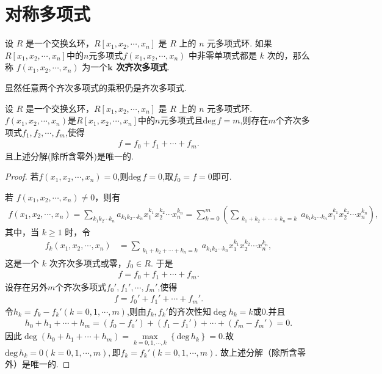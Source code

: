 \documentclass[../../main.tex]{subfiles}%
\begin{document}
\section{对称多项式}

\begin{definition}
设 \( R \) 是一个交换幺环，\( R[x_1, x_2, \cdots, x_n] \) 是 \( R \) 上的 \( n \) 元多项式环. 如果\( R[x_1, x_2, \cdots, x_n] \)中的$n$元多项式\( f(x_1, x_2, \cdots, x_n) \) 中非零单项式都是 \( k \) 次的，那么称 \( f(x_1, x_2, \cdots, x_n) \) 为一个\textbf{\( \boldsymbol{k} \) 次齐次多项式}.
\end{definition}
\begin{remark}
显然任意两个齐次多项式的乘积仍是齐次多项式.
\end{remark}

\begin{theorem}[齐次多项式分解]\label{theorem:多项式的齐次分解}
设 \( R \) 是一个交换幺环，\( R[x_1, x_2, \cdots, x_n] \) 是 \( R \) 上的 \( n \) 元多项式环. \( f(x_1, x_2, \cdots, x_n) \)是\( R[x_1, x_2, \cdots, x_n] \)中的$n$元多项式且$\text{deg}\,f=m$,则存在$m$个齐次多项式$f_1,f_2,\cdots,f_m$,使得
\begin{align*}
f=f_0+f_1+\cdots+f_m.
\end{align*}
且上述分解(除所含零外)是唯一的.
\end{theorem}
\begin{proof}
若$f(x_1,x_2,\cdots,x_n)=0$,则$\text{deg}\,f=0$,取$f_0=f=0$即可.

若 \( f(x_1, x_2, \cdots, x_n) \neq 0 \)，则有
\begin{align*}
f(x_1, x_2, \cdots, x_n) = \sum_{k_1k_2\cdots k_n} a_{k_1k_2\cdots k_n} x_1^{k_1} x_2^{k_2} \cdots x_n^{k_n} = \sum_{k=0}^m \left( \sum_{\substack{k_1 + k_2 + \cdots + k_n = k}} a_{k_1k_2\cdots k_n} x_1^{k_1} x_2^{k_2} \cdots x_n^{k_n} \right),
\end{align*}
其中，当 \( k \geqslant 1 \) 时，令
\begin{align*}
f_k(x_1, x_2, \cdots, x_n) &= \sum_{\substack{k_1 + k_2 + \cdots + k_n = k}} a_{k_1k_2\cdots k_n} x_1^{k_1} x_2^{k_2} \cdots x_n^{k_n},
\end{align*}
这是一个 \( k \) 次齐次多项式或零，\( f_0 \in R \). 于是
\begin{align*}
f = f_0 + f_1 + \cdots + f_m.
\end{align*}
设存在另外$m$个齐次多项式$f_0',f_1',\cdots,f_m'$,使得
\begin{align*}
f=f_0'+f_1'+\cdots+f_m'.
\end{align*}
令$h_k=f_k-f_k'(k=0,1,\cdots,m)$,则由$f_k,f_k'$的齐次性知$\deg h_k=k\text{或}0.$并且
\begin{align*}
h_0+h_1+\cdots+h_m=(f_0-f_0')+(f_1-f_1')+\cdots+(f_m-f_m')=0.
\end{align*}
因此$\deg (h_0+h_1+\cdots+h_m)=\underset{k=0,1,\cdots ,k}{\max}\left\{ \mathrm{deg}\,h_k \right\}=0.$故$\mathrm{deg}\,h_k=0\left( k=0,1,\cdots ,m \right),$即$f_k=f_k'\left( k=0,1,\cdots ,m \right).$
故上述分解（除所含零外）是唯一的.
\end{proof}
\end{document}
